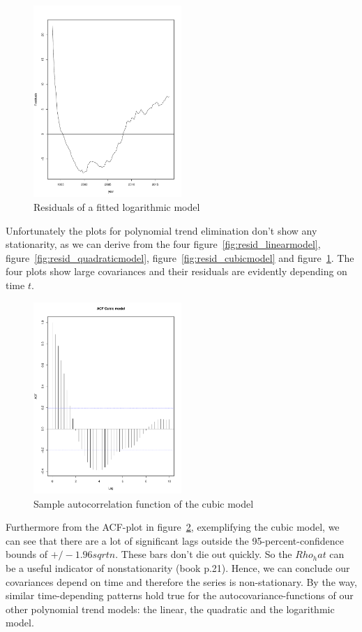 \documentclass[11pt,a4paper]{article}
\begin{document}
\begin{figure}
\centering
\includegraphics[angle=0,
width=0.5\textwidth]{resid_logmodel}
\caption{Residuals of a fitted logarithmic model
\label{fig:resid_logmodel}}
\end{figure}
Unfortunately the plots for polynomial trend elimination don't show any stationarity, as we can derive from the four figure~\ref{fig:resid_linearmodel}, figure~\ref{fig:resid_quadraticmodel}, figure~\ref{fig:resid_cubicmodel} and figure~\ref{fig:resid_logmodel}. The four plots show large covariances and their residuals are evidently depending on time $t$.
\\
\begin{figure}
\centering
\includegraphics[angle=0,
width=0.5\textwidth]{acf_cubicmodel}
\caption{Sample autocorrelation function of the cubic model
\label{fig:acf_cubicmodel}}
\end{figure}
Furthermore from the ACF-plot in figure~\ref{fig:acf_cubicmodel}, exemplifying the cubic model, we can see that there are a lot of significant lags outside the 95-percent-confidence bounds of $+/-1.96sqrt{n}$.  These bars don't die out quickly. So the $Rho_hat$ can be a useful indicator of nonstationarity (book p.21). Hence, we can conclude our covariances depend on time and therefore the series is non-stationary. By the way, similar time-depending patterns hold true for the autocovariance-functions of our other polynomial trend models: the linear, the quadratic and the logarithmic model. 
\end{document}
